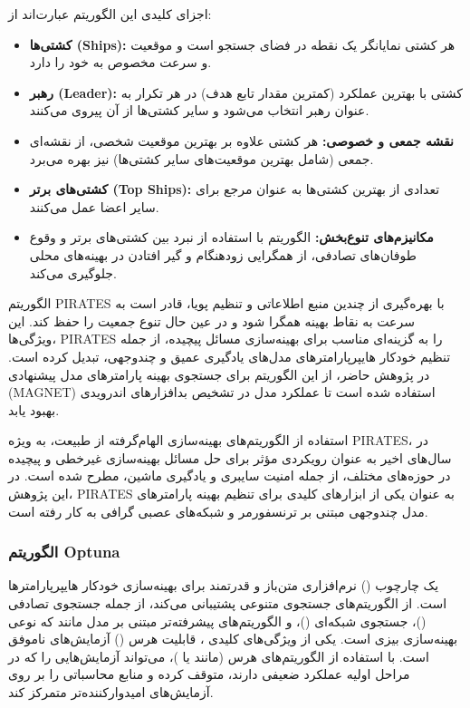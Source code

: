 اجزای کلیدی این الگوریتم عبارت‌اند از:
\begin{itemize}
    \item \textbf{کشتی‌ها (Ships):} هر کشتی نمایانگر یک نقطه در فضای جستجو است و موقعیت و سرعت مخصوص به خود را دارد.
    \item \textbf{رهبر (Leader):} کشتی با بهترین عملکرد (کمترین مقدار تابع هدف) در هر تکرار به عنوان رهبر انتخاب می‌شود و سایر کشتی‌ها از آن پیروی می‌کنند.
    \item \textbf{نقشه جمعی و خصوصی:} هر کشتی علاوه بر بهترین موقعیت شخصی، از نقشه‌ای جمعی (شامل بهترین موقعیت‌های سایر کشتی‌ها) نیز بهره می‌برد.
    \item \textbf{کشتی‌های برتر (Top Ships):} تعدادی از بهترین کشتی‌ها به عنوان مرجع برای سایر اعضا عمل می‌کنند.
    \item \textbf{مکانیزم‌های تنوع‌بخش:} الگوریتم با استفاده از نبرد بین کشتی‌های برتر و وقوع طوفان‌های تصادفی، از همگرایی زودهنگام و گیر افتادن در بهینه‌های محلی جلوگیری می‌کند.
\end{itemize}

الگوریتم PIRATES با بهره‌گیری از چندین منبع اطلاعاتی و تنظیم پویا، قادر است به سرعت به نقاط بهینه همگرا شود و در عین حال تنوع جمعیت را حفظ کند. این ویژگی‌ها، PIRATES را به گزینه‌ای مناسب برای بهینه‌سازی مسائل پیچیده، از جمله تنظیم خودکار هایپرپارامترهای مدل‌های یادگیری عمیق و چندوجهی، تبدیل کرده است. در پژوهش حاضر، از این الگوریتم برای جستجوی بهینه پارامترهای مدل پیشنهادی (MAGNET) استفاده شده است تا عملکرد مدل در تشخیص بدافزارهای اندرویدی بهبود یابد.

استفاده از الگوریتم‌های بهینه‌سازی الهام‌گرفته از طبیعت، به ویژه PIRATES، در سال‌های اخیر به عنوان رویکردی مؤثر برای حل مسائل بهینه‌سازی غیرخطی و پیچیده در حوزه‌های مختلف، از جمله امنیت سایبری و یادگیری ماشین، مطرح شده است. در این پژوهش، PIRATES به عنوان یکی از ابزارهای کلیدی برای تنظیم بهینه پارامترهای مدل چندوجهی مبتنی بر ترنسفورمر و شبکه‌های عصبی گرافی به کار رفته است.

\subsubsection{الگوریتم Optuna}
 \cite{Optuna2019} یک چارچوب () نرم‌افزاری متن‌باز و قدرتمند برای بهینه‌سازی خودکار هایپرپارامترها است.  از الگوریتم‌های جستجوی متنوعی پشتیبانی می‌کند، از جمله جستجوی تصادفی ()، جستجوی شبکه‌ای ()، و الگوریتم‌های پیشرفته‌تر مبتنی بر مدل مانند  که نوعی بهینه‌سازی بیزی است. یکی از ویژگی‌های کلیدی ، قابلیت هرس () آزمایش‌های ناموفق است. با استفاده از الگوریتم‌های هرس (مانند  یا )،  می‌تواند آزمایش‌هایی را که در مراحل اولیه عملکرد ضعیفی دارند، متوقف کرده و منابع محاسباتی را بر روی آزمایش‌های امیدوارکننده‌تر متمرکز کند.

